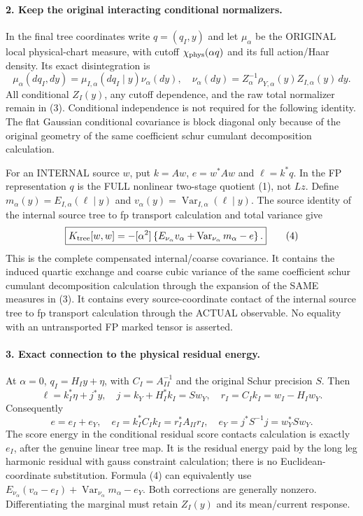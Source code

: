 \documentclass[11pt]{article}
\begin{document}
\paragraph{2. Keep the original interacting conditional normalizers.}
In the final tree coordinates write $q=(q_I,y)$ and let $\mu_\alpha$
be the ORIGINAL local physical-chart measure, with cutoff
$\chi_{\rm phys}(\alpha q)$ and its full action/Haar density.
Its exact disintegration is
\[
 \mu_\alpha(dq_I,dy)=\mu_{I,\alpha}(dq_I\mid y)\nu_\alpha(dy),
 \quad \nu_\alpha(dy)=Z_\alpha^{-1}\rho_{Y,\alpha}(y)
                            Z_{I,\alpha}(y)\,dy. \tag{3}
\]
All conditional $Z_I(y)$, any cutoff dependence, and the raw total
normalizer remain in (3). Conditional independence is not required
for the following identity. The flat Gaussian conditional covariance
is block diagonal only because of the original geometry of the same coefficient schur cumulant decomposition calculation.

For an INTERNAL source $w$, put $k=Aw$, $e=w^*Aw$ and
$\ell=k^*q$. In the FP representation $q$ is the FULL nonlinear
two-stage quotient (1), not $Lz$. Define
$m_\alpha(y)=E_{I,\alpha}(\ell\mid y)$ and
$v_\alpha(y)=\operatorname{Var}_{I,\alpha}(\ell\mid y)$.
The source identity of the internal source tree to fp transport calculation and total variance give
\[
 \boxed{K_{\rm tree}[w,w]=-[\alpha^2]
  \left\{E_{\nu_\alpha}v_\alpha
             +\operatorname{Var}_{\nu_\alpha}m_\alpha-e\right\}.} \tag{4}
\]
This is the complete compensated internal/coarse covariance. It
contains the induced quartic exchange and coarse cubic variance of the same coefficient schur cumulant decomposition calculation
through the expansion of the SAME measures in (3). It contains every
source-coordinate contact of the internal source tree to fp transport calculation through the ACTUAL observable.
No equality with an untransported FP marked tensor is asserted.

\paragraph{3. Exact connection to the physical residual energy.}
At $\alpha=0$, $q_I=H_Iy+\eta$, with
$C_I=A_{II}^{-1}$ and the original Schur precision $S$.
Then
\[
 \ell=k_I^*\eta+j^*y,\quad j=k_Y+H_I^*k_I=S w_Y,
 \quad r_I=C_Ik_I=w_I-H_Iw_Y. \tag{5}
\]
Consequently
\[
 e=e_I+e_Y,\quad e_I=k_I^*C_Ik_I=r_I^*A_{II}r_I,
 \quad e_Y=j^*S^{-1}j=w_Y^*Sw_Y. \tag{6}
\]
The score energy in the conditional residual score contacts calculation is exactly $e_I$, after the genuine
linear tree map. It is the residual energy paid by the long leg harmonic residual with gauss constraint calculation; there is no
Euclidean-coordinate substitution. Formula (4) can equivalently use
$E_{\nu_\alpha}(v_\alpha-e_I)+
\operatorname{Var}_{\nu_\alpha}m_\alpha-e_Y$.
Both corrections are generally nonzero. Differentiating the marginal
must retain $Z_I(y)$ and its mean/current response.
\end{document}
